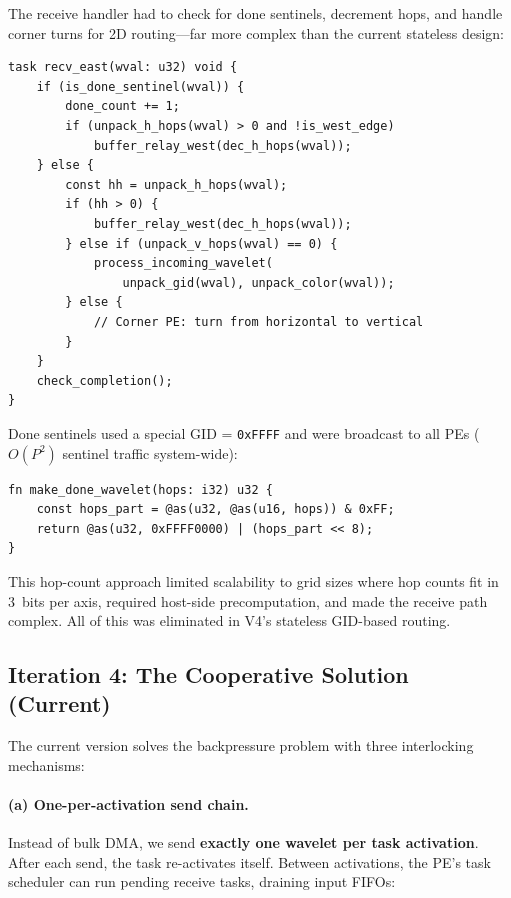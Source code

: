 \documentclass[11pt,letterpaper]{article}
\begin{document}
The receive handler had to check for done sentinels, decrement hops, and handle corner turns for 2D routing---far more complex than the current stateless design:

\begin{lstlisting}[language=CSL, caption={East receive handler (V1--V3)}, label=lst:recv:old]
task recv_east(wval: u32) void {
    if (is_done_sentinel(wval)) {
        done_count += 1;
        if (unpack_h_hops(wval) > 0 and !is_west_edge)
            buffer_relay_west(dec_h_hops(wval));
    } else {
        const hh = unpack_h_hops(wval);
        if (hh > 0) {
            buffer_relay_west(dec_h_hops(wval));
        } else if (unpack_v_hops(wval) == 0) {
            process_incoming_wavelet(
                unpack_gid(wval), unpack_color(wval));
        } else {
            // Corner PE: turn from horizontal to vertical
        }
    }
    check_completion();
}
\end{lstlisting}

Done sentinels used a special GID = \texttt{0xFFFF} and were broadcast to all PEs ($O(P^2)$ sentinel traffic system-wide):

\begin{lstlisting}[language=CSL, numbers=none, caption={Done sentinel (V1--V3 broadcast-style)}]
fn make_done_wavelet(hops: i32) u32 {
    const hops_part = @as(u32, @as(u16, hops)) & 0xFF;
    return @as(u32, 0xFFFF0000) | (hops_part << 8);
}
\end{lstlisting}

This hop-count approach limited scalability to grid sizes where hop counts fit in 3~bits per axis, required host-side precomputation, and made the receive path complex. All of this was eliminated in V4's stateless GID-based routing.

\subsection{Iteration 4: The Cooperative Solution (Current)}
\label{sec:cooperative}

The current version solves the backpressure problem with three interlocking mechanisms:

\paragraph{(a) One-per-activation send chain.}
Instead of bulk DMA, we send \textbf{exactly one wavelet per task activation}. After each send, the task re-activates itself. Between activations, the PE's task scheduler can run pending receive tasks, draining input FIFOs:
\end{document}
